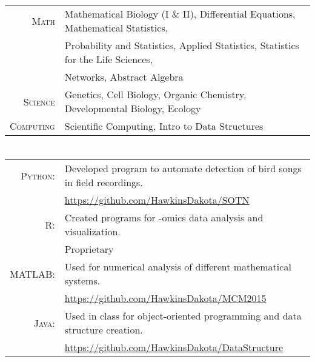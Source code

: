 \documentclass[a4paper,10pt]{article}
\begin{document}
\section{\color{linkcolour}{Relevant Course Work}}
\begin{tabular}{rl}
\textsc{Math} & Mathematical Biology (I \& II), Differential Equations, Mathematical Statistics,
\\ & Probability and Statistics, Applied Statistics, Statistics for the Life Sciences,
\\ & Networks, Abstract Algebra \\
\textsc{Science} & Genetics, Cell Biology, Organic Chemistry, Developmental Biology, Ecology \\
\textsc{Computing} & Scientific Computing, Intro to Data Structures
\end{tabular}

\section{\color{linkcolour}{Programming Languages}}
\begin{tabular}{rl}
 \textsc{Python:}& Developed program to automate detection of bird songs in field recordings.\\
& \small{\href{https://github.com/HawkinsDakota/SOTN}{https://github.com/HawkinsDakota/SOTN}}\\
\textsc{R:}& Created programs for -omics data analysis and visualization.\\
& \small{Proprietary} \\
\textsc{MATLAB:}& Used for numerical analysis of different mathematical systems.\\
& \small{\href{https://github.com/HawkinsDakota/MCM2015}{https://github.com/HawkinsDakota/MCM2015}}\\
\textsc{Java:}& Used in class for object-oriented programming and data structure creation.\\
& \small{\href{https://github.com/HawkinsDakota/DataStructure}{https://github.com/HawkinsDakota/DataStructure}}
\end{tabular}

\end{document}
